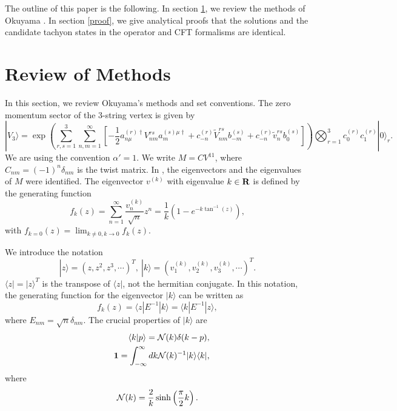 \documentclass[a4paper,12pt]{article}
\begin{document}
The outline of this paper is the following.
In section \ref{def}, we review the methods of Okuyama
\cite{Okuyama-kinetic} \cite{Okuyama-tension}.
In section \ref{proof}, we give  analytical proofs
that the solutions and the candidate tachyon states in the operator
and CFT formalisms are identical.

\section{Review of Methods}\label{def}
\setcounter{equation}{0}
In this section, we review Okuyama's methods \cite{Okuyama-kinetic}
and set conventions.
The zero momentum sector of the 3-string vertex is given by \cite{Gross-Jevicki-1}
\cite{Gross:1986fk}
\begin{equation}
|V_3 \rangle=\exp\left(
\sum_{r,s=1}^{3}\sum_{n,m=1}^{\infty}\left[
-\frac{1}{2}a_{n\mu}^{(r)\dagger}V_{nm}^{rs}a_m^{(s)\mu\dagger}
+c_{-n}^{(r)}\widetilde{V}_{nm}^{rs}b_{-m}^{(s)}+c_{-n}^{(r)}\widetilde{v}_n^{rs}
b_0^{(s)}
\right]\right)
\bigotimes_{r=1}^{3}c_0^{(r)}c_1^{(r)}|0\rangle_r.
\end{equation}
We are using the convention $\alpha '=1$.
We write $M=CV^{11}$,
where $C_{nm}=(-1)^n\delta_{nm}$ is the twist matrix.
In \cite{RSZspectroscopy}, the eigenvectors and the eigenvalues of $M$ were
identified.
The eigenvector $v^{(k)}$
with eigenvalue $k\in {\bf R}$ is defined by the generating
function
\begin{equation}
f_k(z)=\sum_{n=1}^{\infty}\frac{v_n^{(k)}}{\sqrt{n}}z^n=\frac{1}{k}(1-e^{-k\tan^{-1}(z)}),
\end{equation}
with $f_{k=0}(z)=\lim_{k \neq 0,k \rightarrow 0}f_k(z)$.

We introduce the notation
\begin{equation}
|z\rangle=(z,z^2,z^3,\cdots)^{T}, \ |k\rangle=(v^{(k)}_1,v^{(k)}_2,v^{(k)}_3,\cdots)^{T}.
\end{equation}
$\langle z |=|z\rangle^T$ is the transpose of $\langle z |$,
not the hermitian conjugate.
In this notation, the generating function for
the eigenvector $|k\rangle$ can be written as
\begin{equation}
f_k(z)=\langle z|E^{-1}|k\rangle=\langle k|E^{-1}|z\rangle,
\end{equation}
where $E_{nm}=\sqrt{n}\delta_{nm}$.
The crucial properties of $|k\rangle$ are \cite{Okuyama-kinetic}
\begin{eqnarray}
&&\langle k|p\rangle={\cal N}(k)\delta(k-p),\\
&&{\bf 1}=\int_{-\infty}^{\infty}dk
{\cal N}(k)^{-1}|k\rangle\langle k|,\label{completeness}
\end{eqnarray}
where
\begin{equation}\label{N(k)}
{\cal N}(k)=\frac{2}{k}\sinh\left(\frac{\pi}{2}k\right).
\end{equation}
\end{document}
